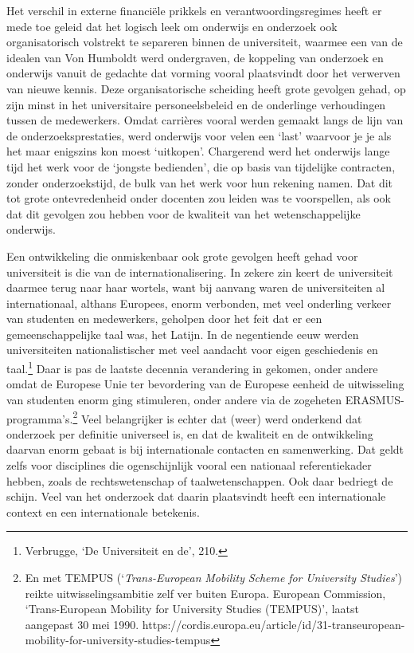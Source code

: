 \documentclass[smallauthor, chapterhaspagenum, nochapterinheader, pagenuminheader,  bigchapnum,medium2, tocpages,  garamond, titleinheader]{jote-book}
\begin{document}
	Het verschil in externe financiële prikkels en verantwoordingsregimes heeft er mede toe geleid dat het logisch leek om onderwijs en onderzoek ook organisatorisch volstrekt te separeren binnen de universiteit, waarmee een van de idealen van Von Humboldt werd ondergraven, de koppeling van onderzoek en onderwijs vanuit de gedachte dat vorming vooral plaatsvindt door het verwerven van nieuwe kennis. Deze organisatorische scheiding heeft grote gevolgen gehad, op zijn minst in het universitaire personeelsbeleid en de onderlinge verhoudingen tussen de medewerkers. Omdat carrières vooral werden gemaakt langs de lijn van de onderzoeksprestaties, werd onderwijs voor velen een ‘last' waarvoor je je als het maar enigszins kon moest ‘uitkopen'. Chargerend werd het onderwijs lange tijd het werk voor de ‘jongste bedienden', die op basis van tijdelijke contracten, zonder onderzoekstijd, de bulk van het werk voor hun rekening namen. Dat dit tot grote ontevredenheid onder docenten zou leiden was te voorspellen, als ook dat dit gevolgen zou hebben voor de kwaliteit van het wetenschappelijke onderwijs.



	Een ontwikkeling die onmiskenbaar ook grote gevolgen heeft gehad voor universiteit is die van de internationalisering. In zekere zin keert de universiteit daarmee terug naar haar wortels, want bij aanvang waren de universiteiten al internationaal, althans Europees, enorm verbonden, met veel onderling verkeer van studenten en medewerkers, geholpen door het feit dat er een gemeenschappelijke taal was, het Latijn. In de negentiende eeuw werden universiteiten nationalistischer met veel aandacht voor eigen geschiedenis en taal.\footnote{Verbrugge, ‘De Universiteit en de', 210.} Daar is pas de laatste decennia verandering in gekomen, onder andere omdat de Europese Unie ter bevordering van de Europese eenheid de uitwisseling van studenten enorm ging stimuleren, onder andere via de zogeheten ERASMUS-programma's.\footnote{En met TEMPUS (‘\emph{Trans-European }\emph{Mobility}\emph{ }\emph{Scheme}\emph{ }\emph{for}\emph{ University Studies}') reikte uitwisselingsambitie zelf ver buiten Europa. European Commission, ‘Trans-European Mobility for University Studies (TEMPUS)', laatst aangepast 30 mei 1990. https://cordis.europa.eu/article/id/31-transeuropean-mobility-for-university-studies-tempus } Veel belangrijker is echter dat (weer) werd onderkend dat onderzoek per definitie universeel is, en dat de kwaliteit en de ontwikkeling daarvan enorm gebaat is bij internationale contacten en samenwerking. Dat geldt zelfs voor disciplines die ogenschijnlijk vooral een nationaal referentiekader hebben, zoals de rechtswetenschap of taalwetenschappen. Ook daar bedriegt de schijn. Veel van het onderzoek dat daarin plaatsvindt heeft een internationale context en een internationale betekenis.
\end{document}
